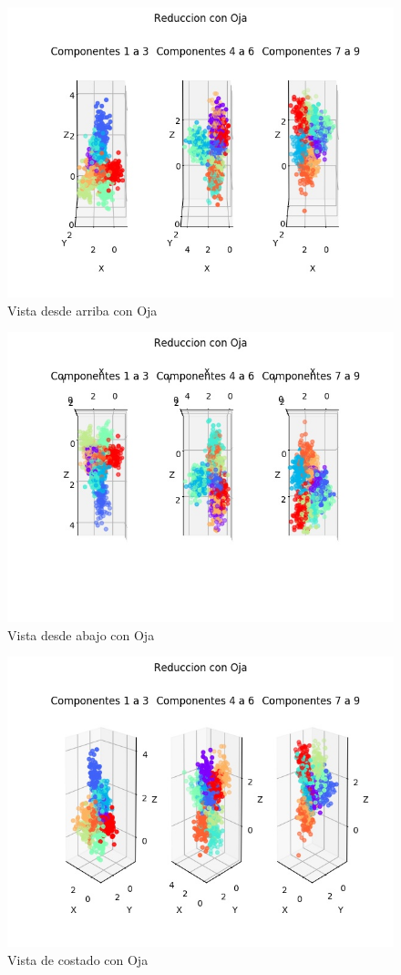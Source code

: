 \begin{figure}[H]
  \includegraphics[width=125mm]{imagenes/reduccion_Oja_1.jpg}
  \caption{Vista desde arriba con Oja}
\end{figure}

\begin{figure}[H]
  \includegraphics[width=125mm]{imagenes/reduccion_Oja_2.jpg}
  \caption{Vista desde abajo con Oja}
\end{figure}

\begin{figure}[H]
  \includegraphics[width=125mm]{imagenes/reduccion_Oja_3.jpg}
  \caption{Vista de costado con Oja}
\end{figure}

